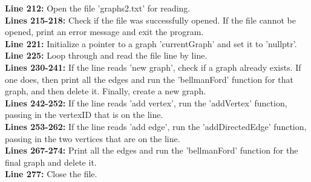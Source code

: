\documentclass[letterpaper, 10pt,DIV=13]{scrartcl}
\numberwithin{equation}{section} %
\numberwithin{figure}{section} %
\numberwithin{table}{section} %
\begin{document}
\textbf{Line 212:} Open the file 'graphs2.txt' for reading. \\
\textbf{Lines 215-218:} Check if the file was successfully opened. If the file cannot be opened, print an error message and exit the program. \\
\textbf{Line 221:} Initialize a pointer to a graph 'currentGraph' and set it to 'nullptr'. \\
\textbf{Line 225:} Loop through and read the file line by line. \\
\textbf{Lines 230-241:} If the line reads 'new graph', check if a graph already exists. If one does, then print all the edges and run the 'bellmanFord' function for that graph, and then delete it. Finally, create a new graph. \\
\textbf{Lines 242-252:} If the line reads 'add vertex', run the 'addVertex' function, passing in the vertexID that is on the line. \\
\textbf{Lines 253-262:} If the line reads 'add edge', run the 'addDirectedEdge' function, passing in the two vertices that are on the line. \\
\textbf{Lines 267-274:} Print all the edges and run the 'bellmanFord' function  for the final graph and delete it. \\
\textbf{Line 277:} Close the file. \\
\end{document}
